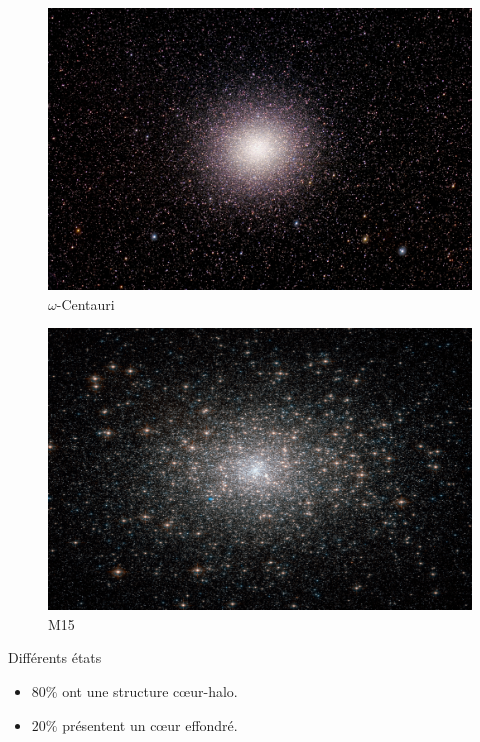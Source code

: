 \documentclass[slidetop,12pt,ucs]{beamer}
\renewcommand{\(}{\ensuremath{\left(}}
\renewcommand{\)}{\ensuremath{\right)}}
\begin{document}
			\begin{frame}
				\begin{minipage}[c]{.4\linewidth}
					\begin{figure}
						\includegraphics[scale=0.200]{graphe/ngc5139_w-cen_HD-2.png}\\$\omega$-Centauri
					\end{figure}
				\end{minipage} \hfill
				\begin{minipage}[c]{.4\linewidth}
					\begin{figure}
						\includegraphics[scale=0.200]{graphe/m15_hst_4089_HD-2.png}\\M15
					\end{figure}
				\end{minipage}
				\begin{block}{Différents états}
					\begin{itemize}
						\item $80\%$ ont une structure cœur-halo.
						\item $20\%$ présentent un cœur effondré.
					\end{itemize}
				\end{block}


\end{frame}
\end{document}
